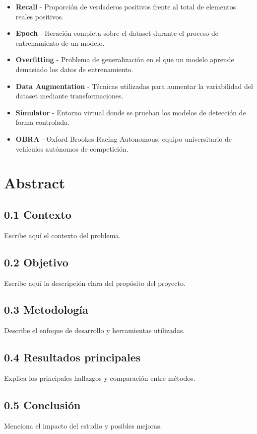 \documentclass[a4paper,11pt]{report}
\begin{document}
\begin{itemize}
    \item \textbf{Recall} - Proporción de verdaderos positivos frente al total de elementos reales positivos.
    \item \textbf{Epoch} - Iteración completa sobre el dataset durante el proceso de entrenamiento de un modelo.
    \item \textbf{Overfitting} - Problema de generalización en el que un modelo aprende demasiado los datos de entrenamiento.
    \item \textbf{Data Augmentation} - Técnicas utilizadas para aumentar la variabilidad del dataset mediante transformaciones.
    \item \textbf{Simulator} - Entorno virtual donde se prueban los modelos de detección de forma controlada.
    \item \textbf{OBRA} - {\small Oxford Brookes Racing Autonomous, equipo universitario de vehículos autónomos de competición.}

\end{itemize}

\newpage

\chapter*{Abstract}
\section*{0.1 Contexto}
Escribe aquí el contexto del problema.

\section*{0.2 Objetivo}
Escribe aquí la descripción clara del propósito del proyecto.

\section*{0.3 Metodología}
Describe el enfoque de desarrollo y herramientas utilizadas.

\section*{0.4 Resultados principales}
Explica los principales hallazgos y comparación entre métodos.

\section*{0.5 Conclusión}
Menciona el impacto del estudio y posibles mejoras.
\newpage
\end{document}

